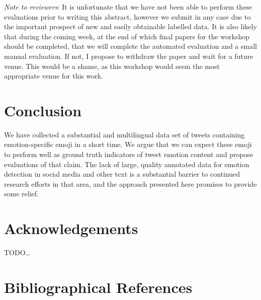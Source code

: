 \documentclass[10pt, a4paper]{article}
\begin{document}
{\em Note to reviewers}: It is unfortunate that we have not been able to perform these evaluations prior to writing this abstract, however we submit in any case due to the important prospect of new and easily obtainable labelled data. It is also likely that during the coming week, at the end of which final papers for the workshop should be completed, that we will complete the automated evaluation and a small manual evaluation. If not, I propose to withdraw the paper and wait for a future venue. This would be a shame, as this workshop would seem the most appropriate venue for this work.

\section{Conclusion}
We have collected a substantial and multilingual data set of tweets containing emotion-specific emoji in a short time. We argue that we can expect these emoji to perform well as ground truth indicators of tweet emotion content and propose evaluations of that claim. 
The lack of large, quality annotated data for emotion detection in social media and other text is a substantial barrier to continued research efforts in that area, and the approach presented here promises to provide some relief.

\section*{Acknowledgements}
TODO\ldots

\section{Bibliographical References}
\label{main:ref}


% 


\end{document}
